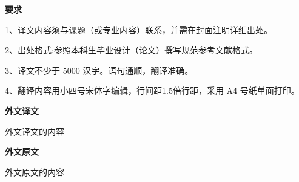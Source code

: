\documentclass{csustThesis}
\begin{document}
    \makeTranslationCover
    
    \pagestyle{empty}  %

    \begin{titlepage}

    \begin{center}
        \bfseries 要求
    \end{center}

    \begin{spacing}{1.5}
1、译文内容须与课题（或专业内容）联系，并需在封面注明详细出处。 

2、出处格式:参照本科生毕业设计（论文）撰写规范参考文献格式。 

3、译文不少于 5000 汉字。语句通顺，翻译准确。 

4、翻译内容用小四号宋体字编辑，行间距1.5倍行距，采用 A4 号纸单面打印。
    \end{spacing}

    \vspace*{\fill}
    \end{titlepage}
    \begin{titlepage}
    \vspace*{\fill}

    \begin{center}
        \bfseries 外文译文
    \end{center}

    \vspace*{\fill}
    \end{titlepage}

外文译文的内容

    \begin{titlepage}
    \vspace*{\fill}

    \begin{center}
        \bfseries 外文原文
    \end{center}

    \vspace*{\fill}
    \end{titlepage}

外文原文的内容
% 
\end{document}
